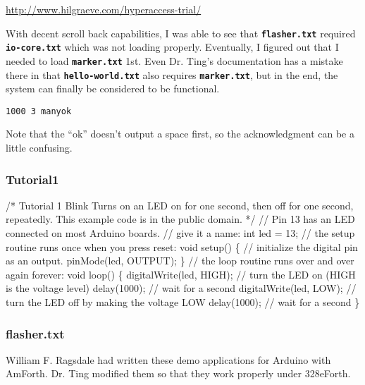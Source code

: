 \documentclass[10pt,english]{article}
\begin{document}
\url{http://www.hilgraeve.com/hyperaccess-trial/}

With decent scroll back capabilities, I was able to see that \texttt{\textbf{flasher.txt}}
required \texttt{\textbf{io-core.txt}} which was not loading properly.
Eventually, I figured out that I needed to load \texttt{\textbf{marker.txt}}
1st. Even Dr. Ting's documentation has a mistake there in that \texttt{\textbf{hello-world.txt}}
also requires \texttt{\textbf{marker.txt}}, but in the end, the system
can finally be considered to be functional.

\begin{lstlisting}
1000 3 manyok
\end{lstlisting}


Note that the ``ok'' doesn't output a space first, so the acknowledgment
can be a little confusing.


\subsubsection{Tutorial1}

\endmoddef
/* Tutorial 1
Blink
Turns on an LED on for one second, then off for one second, repeatedly.
This example code is in the public domain.
*/
// Pin 13 has an LED connected on most Arduino boards.
// give it a name:
int led = 13;
// the setup routine runs once when you press reset:
void setup() \{              
// initialize the digital pin as an output.
pinMode(led, OUTPUT);    
\}
// the loop routine runs over and over again forever:
void loop() \{
digitalWrite(led, HIGH);   // turn the LED on (HIGH is the voltage level)
delay(1000);               // wait for a second
digitalWrite(led, LOW);    // turn the LED off by making the voltage LOW
delay(1000);               // wait for a second
\}
\nwendcode{}\nwdocspar


\subsubsection{flasher.txt}

William F. Ragsdale had written these demo applications for Arduino
with AmForth. Dr. Ting modified them so that they work properly under
328eForth.
\end{document}
